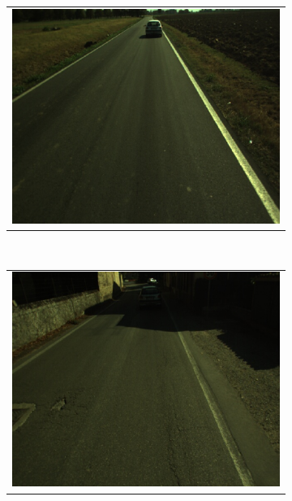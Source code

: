 \begin{figure}[h!]
        \centering
        \begin{subfigure}[b]{0.45\textwidth}
	  \begin{tabular}{c}
	    \includegraphics[width=\textwidth]{countryRoad}
	  \end{tabular}
	  \caption{}\label{fig:cp03_countryRoad}
        \end{subfigure}%
        ~
        \begin{subfigure}[b]{0.45\textwidth}
	  \begin{tabular}{c}
	    \includegraphics[width=\textwidth]{downtown}
	  \end{tabular}
	  \caption{}\label{fig:cp03_downtown}
        \end{subfigure}%
        

\end{figure}
